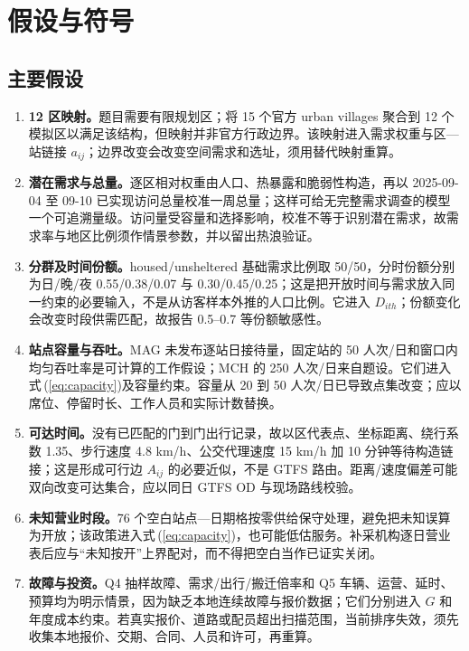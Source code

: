 \documentclass[12pt]{article}
\begin{document}
\section{假设与符号}

\subsection{主要假设}
\begin{enumerate}[label=\textbf{A\arabic*.}]
    \item \textbf{12 区映射。}题目需要有限规划区；将 15 个官方 urban villages 聚合到 12 个模拟区以满足该结构，但映射并非官方行政边界。该映射进入需求权重与区—站链接 $a_{ij}$；边界改变会改变空间需求和选址，须用替代映射重算。
    \item \textbf{潜在需求与总量。}逐区相对权重由人口、热暴露和脆弱性构造，再以 2025-09-04 至 09-10 已实现访问总量校准一周总量；这样可给无完整需求调查的模型一个可追溯量级。访问量受容量和选择影响，校准不等于识别潜在需求，故需求率与地区比例须作情景参数，并以留出热浪验证。
    \item \textbf{分群及时间份额。}housed/unsheltered 基础需求比例取 50/50，分时份额分别为日/晚/夜 0.55/0.38/0.07 与 0.30/0.45/0.25；这是把开放时间与需求放入同一约束的必要输入，不是从访客样本外推的人口比例。它进入 $D_{ith}$；份额变化会改变时段供需匹配，故报告 0.5--0.7 等份额敏感性。
    \item \textbf{站点容量与吞吐。}MAG 未发布逐站日接待量，固定站的 50 人次/日和窗口内均匀吞吐率是可计算的工作假设；MCH 的 250 人次/日来自题设。它们进入式\,(\ref{eq:capacity})及容量约束。容量从 20 到 50 人次/日已导致点集改变；应以席位、停留时长、工作人员和实际计数替换。
    \item \textbf{可达时间。}没有已匹配的门到门出行记录，故以区代表点、坐标距离、绕行系数 1.35、步行速度 4.8 km/h、公交代理速度 15 km/h 加 10 分钟等待构造链接；这是形成可行边 $A_{ij}$ 的必要近似，不是 GTFS 路由。距离/速度偏差可能双向改变可达集合，应以同日 GTFS OD 与现场路线校验。
    \item \textbf{未知营业时段。}76 个空白站点—日期格按零供给保守处理，避免把未知误算为开放；该政策进入式\,(\ref{eq:capacity})，也可能低估服务。补采机构逐日营业表后应与“未知按开”上界配对，而不得把空白当作已证实关闭。
    \item \textbf{故障与投资。}Q4 抽样故障、需求/出行/搬迁倍率和 Q5 车辆、运营、延时、预算均为明示情景，因为缺乏本地连续故障与报价数据；它们分别进入 $G$ 和年度成本约束。若真实报价、道路或配员超出扫描范围，当前排序失效，须先收集本地报价、交期、合同、人员和许可，再重算。
\end{enumerate}
\end{document}
